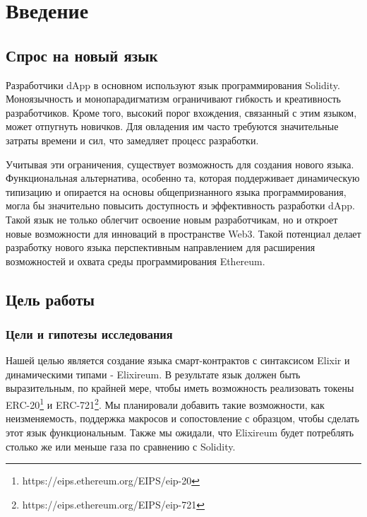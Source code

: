 \chapter{Введение}
\label{chap:intro}

\section{Спрос на новый язык}
\label{sec:langdemand}

Разработчики dApp в основном используют язык программирования Solidity. Моноязычность и монопарадигматизм ограничивают гибкость и креативность разработчиков. Кроме того, высокий порог вхождения, связанный с этим языком, может отпугнуть новичков. Для овладения им часто требуются значительные затраты времени и сил, что замедляет процесс разработки.

Учитывая эти ограничения, существует возможность для создания нового языка. Функциональная альтернатива, особенно та, которая поддерживает динамическую типизацию и опирается на основы общепризнанного языка программирования, могла бы значительно повысить доступность и эффективность разработки dApp. Такой язык не только облегчит освоение новым разработчикам, но и откроет новые возможности для инноваций в пространстве Web3. Такой потенциал делает разработку нового языка перспективным направлением для расширения возможностей и охвата среды программирования Ethereum.

\section{Цель работы}
\label{sec:goal}

\subsection{Цели и гипотезы исследования}
Нашей целью является создание языка смарт-контрактов с синтаксисом Elixir и динамическими типами - Elixireum. В результате язык должен быть выразительным, по крайней мере, чтобы иметь возможность реализовать токены ERC-20\footnote{https://eips.ethereum.org/EIPS/eip-20} и ERC-721\footnote{https://eips.ethereum.org/EIPS/eip-721}. Мы планировали добавить такие возможности, как неизменяемость, поддержка макросов и сопостовление с образцом, чтобы сделать этот язык функциональным. Также мы ожидали, что Elixireum будет потреблять столько же или меньше газа по сравнению с Solidity.

